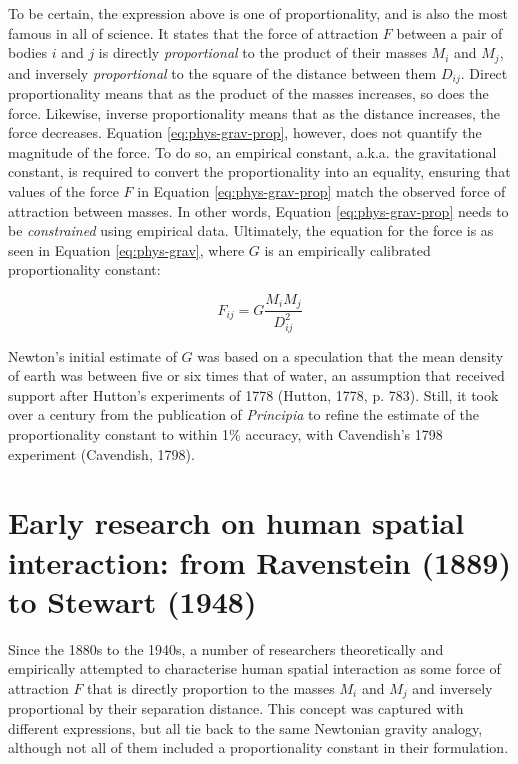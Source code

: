 \documentclass[
11pt, %
oneside, %
english, %
singlespacing, %
]{macthesis} %
\begin{document}
To be certain, the expression above is one of proportionality, and is also the most famous in all of science. It states that the force of attraction \(F\) between a pair of bodies \(i\) and \(j\) is directly \emph{proportional} to the product of their masses \(M_i\) and \(M_j\), and inversely \emph{proportional} to the square of the distance between them \(D_{ij}\). Direct proportionality means that as the product of the masses increases, so does the force. Likewise, inverse proportionality means that as the distance increases, the force decreases. Equation \ref{eq:phys-grav-prop}, however, does not quantify the magnitude of the force. To do so, an empirical constant, a.k.a. the gravitational constant, is required to convert the proportionality into an equality, ensuring that values of the force \(F\) in Equation \ref{eq:phys-grav-prop} match the observed force of attraction between masses. In other words, Equation \ref{eq:phys-grav-prop} needs to be \emph{constrained} using empirical data. Ultimately, the equation for the force is as seen in Equation \ref{eq:phys-grav}, where \(G\) is an empirically calibrated proportionality constant:

\begin{equation}
\label{eq:phys-grav}
F_{ij} = G \frac{M_i M_j} {D_{ij}^{2}}
\end{equation} 

Newton's initial estimate of \(G\) was based on a speculation that the mean density of earth was between five or six times that of water, an assumption that received support after Hutton's experiments of 1778 (Hutton, 1778, p. 783). Still, it took over a century from the publication of \emph{Principia} to refine the estimate of the proportionality constant to within 1\% accuracy, with Cavendish's 1798 experiment (Cavendish, 1798).

\section{Early research on human spatial interaction: from Ravenstein (1889) to Stewart (1948)}\label{early-research-on-human-spatial-interaction-from-ravenstein-1889-to-stewart-1948}

Since the 1880s to the 1940s, a number of researchers theoretically and empirically attempted to characterise human spatial interaction as some force of attraction \(F\) that is directly proportion to the masses \(M_i\) and \(M_j\) and inversely proportional by their separation distance. This concept was captured with different expressions, but all tie back to the same Newtonian gravity analogy, although not all of them included a proportionality constant in their formulation.
\end{document}
